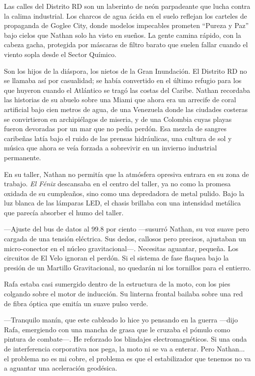 \documentclass[11pt,twoside]{book}
\begin{document}
Las calles del Distrito RD son un laberinto de neón parpadeante que lucha contra la calima industrial. Los charcos de agua ácida en el suelo reflejan los carteles de propaganda de Goglee City, donde modelos impecables prometen ``Pureza y Paz'' bajo cielos que Nathan solo ha visto en sueños. La gente camina rápido, con la cabeza gacha, protegida por máscaras de filtro barato que suelen fallar cuando el viento sopla desde el Sector Químico.

Son los hijos de la diáspora, los nietos de la Gran Inundación. El Distrito RD no se llamaba así por casualidad; se había convertido en el último refugio para los que huyeron cuando el Atlántico se tragó las costas del Caribe. Nathan recordaba las historias de su abuelo sobre una Miami que ahora era un arrecife de coral artificial bajo cien metros de agua, de una Venezuela donde las ciudades costeras se convirtieron en archipiélagos de miseria, y de una Colombia cuyas playas fueron devoradas por un mar que no pedía perdón. Esa mezcla de sangres caribeñas latía bajo el ruido de las prensas hidráulicas, una cultura de sol y música que ahora se veía forzada a sobrevivir en un invierno industrial permanente.

En su taller, Nathan no permitía que la atmósfera opresiva entrara en su zona de trabajo. \textit{El Fénix} descansaba en el centro del taller, ya no como la promesa oxidada de su cumpleaños, sino como una depredadora de metal pulido. Bajo la luz blanca de las lámparas LED, el chasis brillaba con una intensidad metálica que parecía absorber el humo del taller.

---Ajuste del bus de datos al 99.8 por ciento ---susurró Nathan, su voz suave pero cargada de una tensión eléctrica. Sus dedos, callosos pero precisos, ajustaban un micro-conector en el núcleo gravitacional---. Necesitas aguantar, pequeña. Los circuitos de El Velo ignoran el perdón. Si el sistema de fase flaquea bajo la presión de un Martillo Gravitacional, no quedarán ni los tornillos para el entierro.

Rafa estaba casi sumergido dentro de la estructura de la moto, con los pies colgando sobre el motor de inducción. Su linterna frontal bailaba sobre una red de fibra óptica que emitía un suave pulso verde.

---Tranquilo manín, que este cableado lo hice yo pensando en la guerra ---dijo Rafa, emergiendo con una mancha de grasa que le cruzaba el pómulo como pintura de combate---. He reforzado los blindajes electromagnéticos. Si una onda de interferencia corporativa nos pega, la moto ni se va a enterar. Pero Nathan... el problema no es mi cobre, el problema es que el estabilizador que tenemos no va a aguantar una aceleración geodésica.
\end{document}
